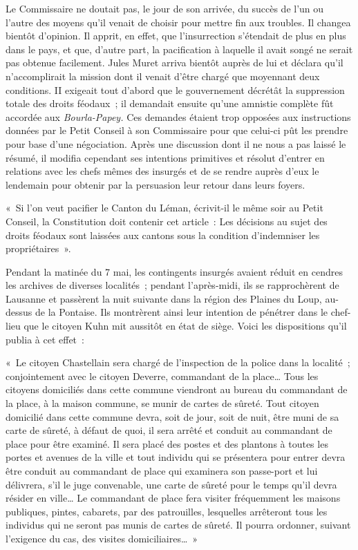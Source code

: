 \documentclass[french,twoside]{book} %
\newenvironment{quoteblock}%
  {\begin{quoting}}
  {\end{quoting}}
\newenvironment{quotebar}{%
    \def\FrameCommand{{\color{rubric!10!}\vrule width 0.5em} \hspace{0.9em}}%
    \def\OuterFrameSep{\itemsep} %
    \MakeFramed {\advance\hsize-\width \FrameRestore}
  }%
  {%
    \endMakeFramed
  }
\renewenvironment{quoteblock}%
  {%
    \savenotes
    \setstretch{0.9}
    \normalfont
    \begin{quotebar}
  }
  {%
    \end{quotebar}
    \spewnotes
  }
\begin{document}
Le Commissaire ne doutait pas, le jour de son arrivée, du succès de l’un ou l’autre des moyens qu’il venait de choisir pour mettre fin aux troubles. Il changea bientôt d’opinion. Il apprit, en effet, que l’insurrection s’étendait de plus en plus dans le pays, et que, d’autre part, la pacification à laquelle il avait songé ne serait pas obtenue facilement. Jules Muret arriva bientôt auprès de lui et déclara qu’il n’accomplirait la mission dont il venait d’être chargé que moyennant deux conditions. II exigeait tout d’abord que le gouvernement décrétât la suppression totale des droits féodaux ; il demandait ensuite qu’une amnistie complète fût accordée aux \emph{Bourla-Papey.} Ces demandes étaient trop opposées aux instructions données par le Petit Conseil à son Commissaire pour que celui-ci pût les prendre pour base d’une négociation. Après une discussion dont il ne nous a pas laissé le résumé, il modifia cependant ses intentions primitives et résolut d’entrer en relations avec les chefs mêmes des insurgés et de se rendre auprès d’eux le lendemain pour obtenir par la persuasion leur retour dans leurs foyers.\par

\begin{quoteblock}
 \noindent « Si l’on veut pacifier le Canton du Léman, écrivit-il le même soir au Petit Conseil, la Constitution doit contenir cet article : Les décisions au sujet des droits féodaux sont laissées aux cantons sous la condition d’indemniser les propriétaires ».
 \end{quoteblock}

\noindent Pendant la matinée du 7 mai, les contingents insurgés avaient réduit en cendres les archives de diverses localités ; pendant l’après-midi, ils se rapprochèrent de Lausanne et passèrent la nuit suivante dans la région des Plaines du Loup, au-dessus de la Pontaise. Ils montrèrent ainsi leur intention de pénétrer dans le chef-lieu que le citoyen Kuhn mit aussitôt en état de siège. Voici les dispositions qu’il publia à cet effet :\par

\begin{quoteblock}
 \noindent « Le citoyen Chastellain sera chargé de l’inspection de la police dans la localité ; conjointement avec le citoyen Deverre, commandant de la place… Tous les citoyens domiciliés dans cette commune viendront au bureau du commandant de la place, à la maison commune, se munir de cartes de sûreté. Tout citoyen domicilié dans cette commune devra, soit de jour, soit de nuit, être muni de sa carte de sûreté, à défaut de quoi, il sera arrêté et conduit au commandant de place pour être examiné. Il sera placé des postes et des plantons à toutes les portes et avenues de la ville et tout individu qui se présentera pour entrer devra être conduit au commandant de place qui examinera son passe-port et lui délivrera, s’il le juge convenable, une carte de sûreté pour le temps qu’il devra résider en ville… Le commandant de place fera visiter fréquemment les maisons publiques, pintes, cabarets, par des patrouilles, lesquelles arrêteront tous les individus qui ne seront pas munis de cartes de sûreté. Il pourra ordonner, suivant l’exigence du cas, des visites domiciliaires… »
 \end{quoteblock}
\end{document}
